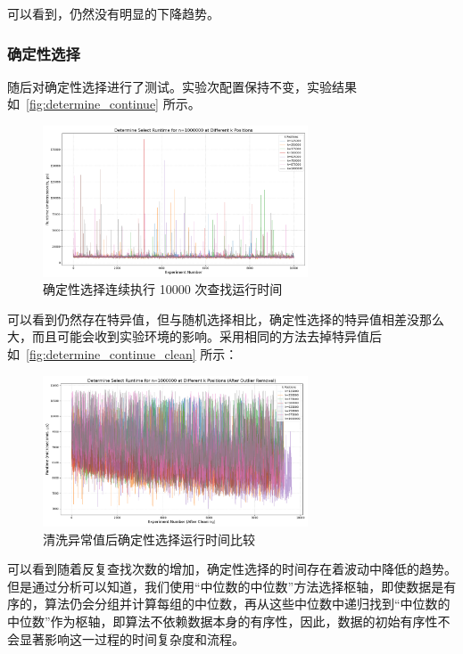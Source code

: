 可以看到，仍然没有明显的下降趋势。

\subsubsection{确定性选择}
随后对确定性选择进行了测试。实验次配置保持不变，实验结果如~\autoref{fig:determine_continue} 所示。\begin{figure}
    \centering
    \includegraphics[width=0.7\textwidth]{../figure/determine_continue.png}
    \caption{确定性选择连续执行 10000 次查找运行时间}
    \label{fig:determine_continue}
\end{figure}

可以看到仍然存在特异值，但与随机选择相比，确定性选择的特异值相差没那么大，而且可能会收到实验环境的影响。采用相同的方法去掉特异值后如~\autoref{fig:determine_continue_clean} 所示：
\begin{figure}[htbp]
    \centering
    \includegraphics[width=0.7\textwidth]{../figure/determine_continue_clean.png}
    \caption{清洗异常值后确定性选择运行时间比较}
    \label{fig:determine_continue_clean}
\end{figure}

可以看到随着反复查找次数的增加，确定性选择的时间存在着波动中降低的趋势。但是通过分析可以知道，我们使用``中位数的中位数''方法选择枢轴，即使数据是有序的，算法仍会分组并计算每组的中位数，再从这些中位数中递归找到``中位数的中位数''作为枢轴，即算法不依赖数据本身的有序性，因此，数据的初始有序性不会显著影响这一过程的时间复杂度和流程。

